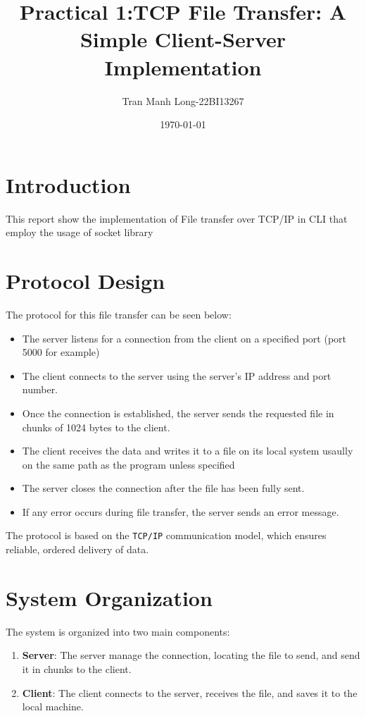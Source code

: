 \documentclass[12pt]{article}
\title{Practical 1:TCP File Transfer: A Simple Client-Server Implementation}
\author{Tran Manh Long-22BI13267}
\date{\today}
\begin{document}
\maketitle

\section{Introduction}
This report show the implementation of File transfer over TCP/IP in CLI that employ the usage of socket library

\section{Protocol Design}
The protocol for this file transfer can be seen below: 

\begin{itemize}
    \item The server listens for a connection from the client on a specified port (port 5000 for example)
    \item The client connects to the server using the server's IP address and port number.
    \item Once the connection is established, the server sends the requested file in chunks of 1024 bytes to the client.
    \item The client receives the data and writes it to a file on its local system usaully on the same path as the program unless specified
    \item The server closes the connection after the file has been fully sent.
    \item If any error occurs during file transfer, the server sends an error message.
\end{itemize}

The protocol is based on the \texttt{TCP/IP} communication model, which ensures reliable, ordered delivery of data.

\section{System Organization}
The system is organized into two main components:
\begin{enumerate}
    \item \textbf{Server}: The server manage the connection, locating the file to send, and send it in chunks to the client.
    \item \textbf{Client}: The client connects to the server, receives the file, and saves it to the local machine.
\end{enumerate}
\end{document}
